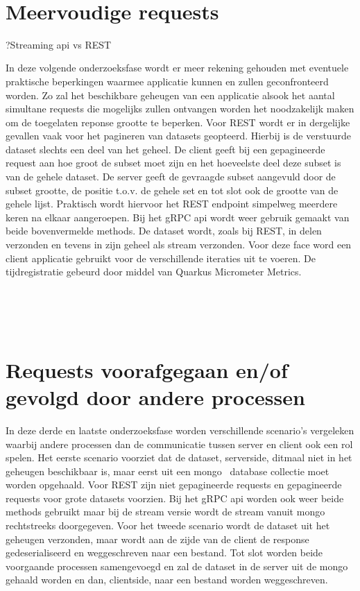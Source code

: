 ~\autocite{Postman}\\

\section{Meervoudige requests}

?Streaming api vs REST

In deze volgende onderzoeksfase wordt er meer rekening gehouden met eventuele praktische beperkingen waarmee applicatie kunnen en zullen geconfronteerd worden.
Zo zal het beschikbare geheugen van een applicatie alsook het aantal simultane requests die mogelijks zullen ontvangen worden het noodzakelijk maken om
de toegelaten reponse grootte te beperken. Voor REST wordt er in dergelijke gevallen vaak voor het pagineren van datasets geopteerd.
Hierbij is de verstuurde dataset slechts een deel van het geheel. De client geeft bij een gepagineerde request aan hoe groot de subset moet zijn
en het hoeveelste deel deze subset is van de gehele dataset. De server geeft de gevraagde subset aangevuld door de subset grootte, de positie t.o.v. de gehele set
en tot slot ook de grootte van de gehele lijst. Praktisch wordt hiervoor het REST endpoint simpelweg meerdere keren na elkaar aangeroepen.
Bij het gRPC api wordt weer gebruik gemaakt van beide bovenvermelde methods. De dataset wordt, zoals bij REST, in delen verzonden en tevens in zijn geheel als stream verzonden.
Voor deze face word een client applicatie gebruikt voor de verschillende iteraties uit te voeren. De tijdregistratie gebeurd door middel van Quarkus Micrometer Metrics.

~\autocite{quarkusMicrometer}\\
~\autocite{quarkusRESTclient}\\
~\autocite{quarkusgRPCclient}\\

\section{Requests voorafgegaan en/of gevolgd door andere processen}

In deze derde en laatste onderzoeksfase worden verschillende scenario's vergeleken waarbij andere processen dan de communicatie tussen server en client
ook een rol spelen. \newline
Het eerste scenario voorziet dat de dataset, serverside, ditmaal niet in het geheugen beschikbaar is, maar eerst uit een mongo~\parencite{MongoDB} database collectie moet worden opgehaald.
Voor REST zijn niet gepagineerde requests en gepagineerde requests voor grote datasets voorzien. Bij het gRPC api worden ook weer beide methods gebruikt maar bij de stream versie
wordt de stream vanuit mongo rechtstreeks doorgegeven. \newline
Voor het tweede scenario wordt de dataset uit het geheugen verzonden, maar wordt aan de zijde van de client de response gedeserialiseerd en weggeschreven naar een bestand.
Tot slot worden beide voorgaande processen samengevoegd en zal de dataset in de server uit de mongo gehaald worden en dan, clientside, naar een bestand worden weggeschreven.

